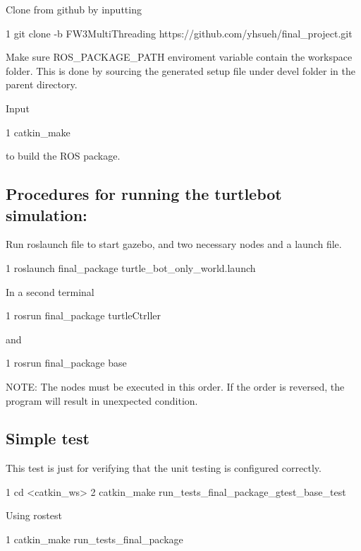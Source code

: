 \begin{DoxyEnumerate}
\item Clone from github by inputting 
\begin{DoxyCode}
1 git clone -b FW3MultiThreading https://github.com/yhsueh/final\_project.git
\end{DoxyCode}

\item Make sure R\+O\+S\+\_\+\+P\+A\+C\+K\+A\+G\+E\+\_\+\+P\+A\+TH enviroment variable contain the workspace folder. This is done by sourcing the generated setup file under devel folder in the parent directory.
\item Input 
\begin{DoxyCode}
1 catkin\_make
\end{DoxyCode}
 to build the R\+OS package.
\end{DoxyEnumerate}

\subsection*{Procedures for running the turtlebot simulation\+:}


\begin{DoxyEnumerate}
\item Run roslaunch file to start gazebo, and two necessary nodes and a launch file. 
\begin{DoxyCode}
1 roslaunch final\_package turtle\_bot\_only\_world.launch
\end{DoxyCode}
 In a second terminal 
\begin{DoxyCode}
1 rosrun final\_package turtleCtrller
\end{DoxyCode}
 and 
\begin{DoxyCode}
1 rosrun final\_package base
\end{DoxyCode}
 N\+O\+TE\+: The nodes must be executed in this order. If the order is reversed, the program will result in unexpected condition.
\end{DoxyEnumerate}

\subsection*{Simple test}


\begin{DoxyEnumerate}
\item This test is just for verifying that the unit testing is configured correctly. 
\begin{DoxyCode}
1 cd <catkin\_ws>
2 catkin\_make run\_tests\_final\_package\_gtest\_base\_test
\end{DoxyCode}

\item Using rostest 
\begin{DoxyCode}
1 catkin\_make run\_tests\_final\_package
\end{DoxyCode}
 
\end{DoxyEnumerate}